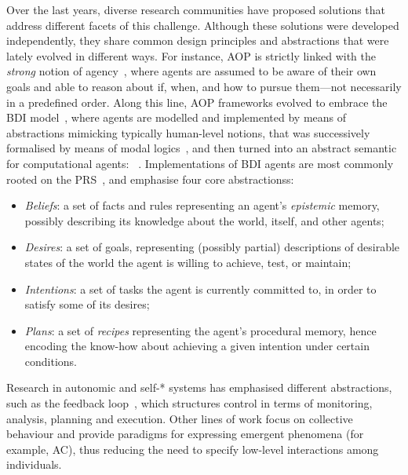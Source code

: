 \documentclass[12pt,a4paper,openright,twoside]{book}
\begin{document}
Over the last years,
diverse research communities have proposed solutions 
that address different facets of this challenge.
%
Although these solutions were developed independently,
they share common design principles and abstractions 
that were lately evolved in different ways.
%
For instance, 
\ac{AOP} is strictly linked with the \emph{strong} notion of agency~\cite{wooldridge1995intelligent-agents},
where agents are assumed to be aware of their own goals and able to reason about if,
when, and how to pursue them---not necessarily in a predefined order.
%
Along this line, \ac{AOP} frameworks evolved to embrace the \acf{BDI} model~\cite{bratman1988bdi},
where agents are modelled and implemented by means of abstractions mimicking typically human-level notions,
that was successively formalised by means of modal logics~\cite{CohenL90},
and then turned into an abstract semantic for computational agents: \agentspeak~\cite{rao1991bdi}.
%
Implementations of \ac{BDI} agents
are most commonly rooted on the \ac{PRS}~\cite{georgeff1987reactive},
and emphasise four core abstractionss:
%
\begin{itemize}
    \item \emph{Beliefs}: a set of facts and rules representing an agent's \emph{epistemic} memory,
    possibly describing its knowledge about the world, itself, and other agents;

    \item \emph{Desires}: a set of goals, representing (possibly partial) descriptions of desirable states of the world
    the agent is willing to achieve, test, or maintain;

    \item \emph{Intentions}: a set of tasks the agent is currently committed to, in order to satisfy some of its desires;

    \item \emph{Plans}: a set of \emph{recipes} representing the agent's procedural memory,
    hence encoding the know-how about achieving a given intention under certain conditions.
\end{itemize}

Research in autonomic and self-* systems 
has emphasised different abstractions, 
such as the \mapek{} feedback loop~\cite{DBLP:journals/computer/KephartC03},
which structures control in terms of monitoring, analysis, planning and execution. 
%
Other lines of work focus on collective behaviour 
and provide paradigms for expressing emergent phenomena 
(for example, \ac{AC}), 
thus reducing the need to specify low-level interactions among individuals.
\end{document}
